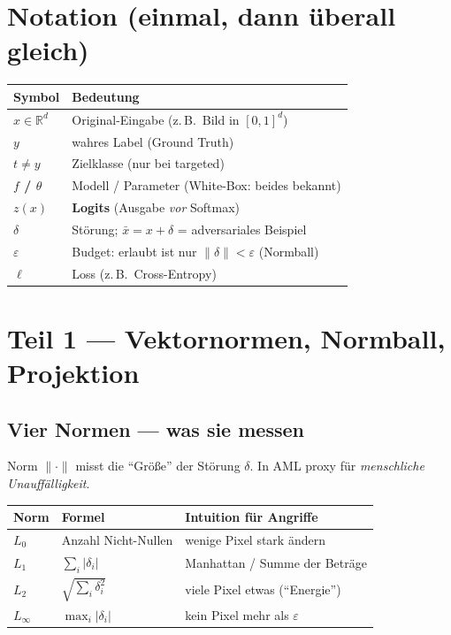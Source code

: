 \documentclass[11pt,a4paper]{article}
\newcommand{\R}{\mathbb{R}}
\newcommand{\eps}{\varepsilon}
\begin{document}
\section{Notation (einmal, dann überall gleich)}

\begin{center}
\renewcommand{\arraystretch}{1.2}
\begin{tabularx}{\textwidth}{@{}>{\bfseries}l X@{}}
\toprule
Symbol & Bedeutung \\
\midrule
$x\in\R^d$ & Original-Eingabe (z.\,B.\ Bild in $[0,1]^d$) \\
$y$ & wahres Label (Ground Truth) \\
$t\neq y$ & Zielklasse (nur bei targeted) \\
$f$ / $\theta$ & Modell / Parameter (White-Box: beides bekannt) \\
$z(x)$ & \textbf{Logits} (Ausgabe \emph{vor} Softmax) \\
$\delta$ & Störung; $\bar x = x+\delta$ = adversariales Beispiel \\
$\eps$ & Budget: erlaubt ist nur $\|\delta\| < \eps$ (Normball) \\
$\ell$ & Loss (z.\,B.\ Cross-Entropy) \\
\bottomrule
\end{tabularx}
\end{center}

\section{Teil 1 --- Vektornormen, Normball, Projektion}

\subsection{Vier Normen --- was sie messen}
Norm $\|\cdot\|$ misst die ``Größe'' der Störung $\delta$. In AML proxy für
\emph{menschliche Unauffälligkeit}.

\begin{center}
\renewcommand{\arraystretch}{1.25}
\begin{tabular}{@{}llp{5.8cm}@{}}
\toprule
\textbf{Norm} & \textbf{Formel} & \textbf{Intuition für Angriffe} \\
\midrule
$L_0$ & Anzahl Nicht-Nullen & wenige Pixel stark ändern \\
$L_1$ & $\sum_i |\delta_i|$ & Manhattan / Summe der Beträge \\
$L_2$ & $\sqrt{\sum_i \delta_i^2}$ & viele Pixel etwas (``Energie'') \\
$L_\infty$ & $\max_i |\delta_i|$ & kein Pixel mehr als $\eps$ \\
\bottomrule
\end{tabular}
\end{center}
\end{document}
